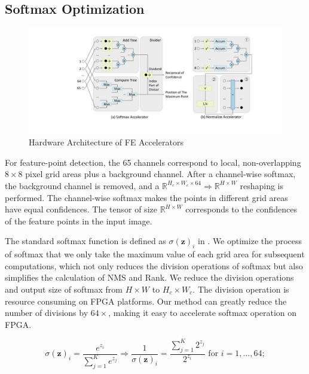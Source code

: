 \subsection{Softmax Optimization}
\label{sec:softmaxopt}

\begin{figure}[t]
    \centering  
    \includegraphics[width=0.9\linewidth]{fig/FEaccelerator.pdf}
    \caption{Hardware Architecture of FE Accelerators}
    \label{fig:FEaccelerator}
\end{figure}

For feature-point detection, the 65 channels correspond to local, non-overlapping $8 \times 8$ pixel grid areas plus a background channel. 
After a channel-wise softmax, the background channel is removed, and a $\mathbb{R}^{H_c\times W_c\times64}\Rightarrow \mathbb{R}^{H\times W}$ reshaping is performed. 
The channel-wise softmax makes the points in different grid areas have equal confidences.
The tensor of size $\mathbb{R}^{H\times W}$ corresponds to the confidences of the feature points in the input image.

The standard softmax function is defined as $\sigma (\mathbf {z} )_{i}$ in .
We optimize the process of softmax that we only take the maximum value of each grid area for subsequent computations, which not only reduces the division operations of softmax but also simplifies the calculation of NMS and Rank.
We reduce the division operations and output size of softmax from $H \times W$ to $H_c \times W_c$.
The division operation is resource consuming on FPGA platforms. 
Our method can greatly reduce the number of divisions by $64 \times$, making it easy to accelerate softmax operation on FPGA.

\begin{equation}
    \sigma (\mathbf {z} )_{i}={\frac {e^{z_{i}}}{\sum _{j=1}^{K}e^{z_{j}}}}
    \Rightarrow
    \frac{1}{\sigma (\mathbf {z} )_{i}}={\frac {\sum _{j=1}^{K}2^{z_{j}}}{2^{z_{i}}}}{\text{ for }}i=1,\dotsc ,64;
    \label{equ:softmax_hard}
\end{equation}

